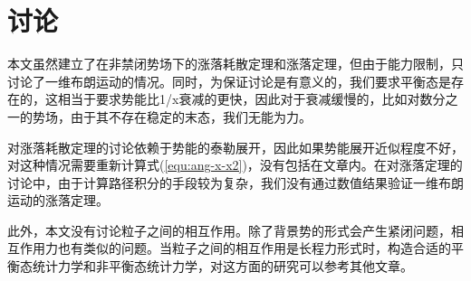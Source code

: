 \section{讨论}
本文虽然建立了在非禁闭势场下的涨落耗散定理和涨落定理，但由于能力限制，只讨论了一维布朗运动的情况。同时，为保证讨论是有意义的，我们要求平衡态是存在的，这相当于要求势能比1/x衰减的更快，因此对于衰减缓慢的，比如对数分之一的势场，由于其不存在稳定的末态，我们无能为力。

对涨落耗散定理的讨论依赖于势能的泰勒展开，因此如果势能展开近似程度不好，对这种情况需要重新计算式(\ref{equ:ang-x-x2})，没有包括在文章内。在对涨落定理的讨论中，由于计算路径积分的手段较为复杂，我们没有通过数值结果验证一维布朗运动的涨落定理。

此外，本文没有讨论粒子之间的相互作用。除了背景势的形式会产生紧闭问题，相互作用力也有类似的问题。当粒子之间的相互作用是长程力形式时，构造合适的平衡态统计力学和非平衡态统计力学，对这方面的研究可以参考其他文章。\cite{laiThermodynamicEquilibriumLongrange1986,suenThermodynamicEquilibriumLongrange1987,suenThermodynamicEquilibriumLongrange1987a}